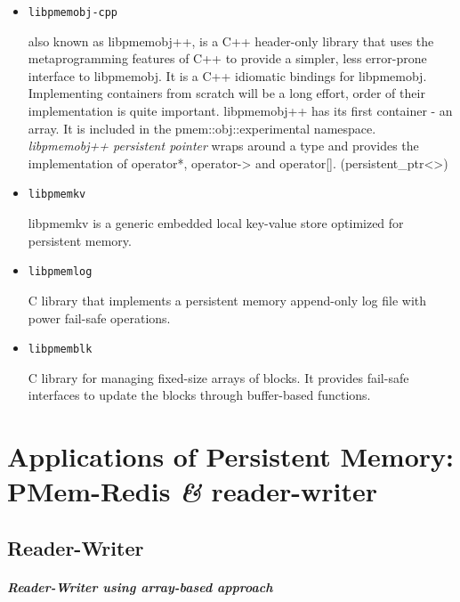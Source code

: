 \documentclass[11pt,swedish, openany, oneside]{book}
\begin{document}
\begin{enumerate}
\begin{itemize}
    \item \texttt{libpmemobj-cpp}
    
    also known as libpmemobj++, is a C++ header-only library that uses the metaprogramming features of	C++ to provide a simpler, less error-prone interface to libpmemobj. It is a C++ idiomatic bindings for libpmemobj. Implementing containers from scratch will be a long effort, order of their implementation is quite important. libpmemobj++ has its  first container - an array. It is included in the pmem::obj::experimental namespace. \textit{libpmemobj++ persistent pointer} wraps around a type and provides the implementation of operator*,  operator-> and operator[]. (persistent\_ptr<>)

    \item \texttt{libpmemkv}
    
    libpmemkv is a generic embedded local key-value store optimized for persistent memory.

    \item \texttt{libpmemlog}
    
    C library that implements a persistent memory append-only log file with power fail-safe operations.

    \item \texttt{libpmemblk}
    
    C library for managing fixed-size arrays of blocks. It provides fail-safe interfaces to update the blocks through buffer-based functions.
\end{itemize}
\end{enumerate}

    \begin{minipage}[fontsize = \footnotesize]{\linewidth}
    {\let\clearpage\relax\chapter{\large Applications of Persistent Memory: PMem-Redis \textit{\&} reader-writer}}
\section{Reader-Writer}
    \paragraph{Reader-Writer using array-based approach}
    \label{lst:array_code}
    \inputminted{c}{code/arr.c}
\end{minipage}
\end{document}
